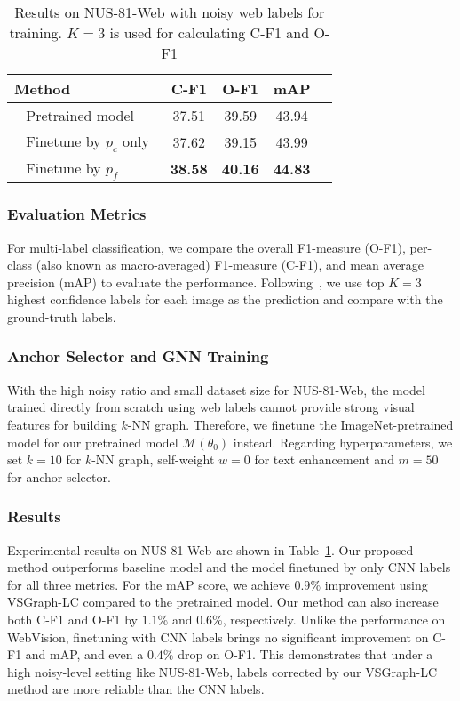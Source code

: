 \documentclass[sigconf]{acmart}
\begin{document}
\setlength{\tabcolsep}{4pt}
\begin{table}
	\centering
	\caption{Results on NUS-81-Web with noisy web labels for training. $K=3$ is used for calculating C-F1 and O-F1}
	\label{tab:nuswide}
\begin{tabular}{lcccc}
		\toprule 
Method & C-F1 & O-F1 & mAP \\
		\midrule
		~ Pretrained model ~  &37.51 &39.59 &43.94\\
		~ Finetune by $p_c$ only~ &37.62 &39.15 &43.99 \\
		~ Finetune by $p_f$~ & \textbf{38.58} & \textbf{40.16} &\textbf{44.83}\\
		\bottomrule
	\end{tabular}
\end{table}

\subsubsection{Evaluation Metrics}
For multi-label classification, we compare the overall F1-measure (O-F1), per-class (also known as macro-averaged) F1-measure (C-F1), and mean average precision (mAP) to evaluate the performance.
Following~\cite{Wang2016cnnrnn}, we use top $K=3$ highest confidence labels for each image as the prediction and compare with the ground-truth labels. 

\subsubsection{Anchor Selector and GNN Training}
With the high noisy ratio and small dataset size for NUS-81-Web, the model trained directly from scratch using web labels cannot provide strong visual features for building $k$-NN graph. 
Therefore, we finetune the ImageNet-pretrained model for our pretrained model $\mathcal{M}(\theta_0)$ instead. Regarding hyperparameters, we set $k=10$ for $k$-NN graph, self-weight $w=0$ for text enhancement and $m=50$ for anchor selector.  

\subsubsection{Results}
Experimental results on NUS-81-Web are shown in Table~\ref{tab:nuswide}. Our proposed method outperforms baseline model and the model finetuned by only CNN labels for all three metrics.
For the mAP score, we achieve $0.9\%$ improvement using VSGraph-LC compared to the pretrained model. Our method can also increase both C-F1 and O-F1 by $1.1\%$ and $0.6\%$, respectively.
Unlike the performance on WebVision, finetuning with CNN labels brings no significant improvement on C-F1 and mAP, and even a $0.4\%$ drop on O-F1. 
This demonstrates that under a high noisy-level setting like NUS-81-Web, labels corrected by our VSGraph-LC method are more reliable than the CNN labels.
\end{document}
